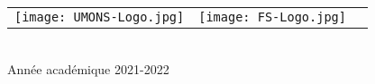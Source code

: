 \begin{titlepage}
\begin{center}
        \begin{center}
            \begin{tabular}[t]{c c c}
                \texttt{[image: UMONS-Logo.jpg]} &
                \texttt{[image: FS-Logo.jpg]} &
            \end{tabular}
        \end{center}~\\
        
        {\large Année académique 2021-2022}
        
    \end{center}
\end{titlepage}
